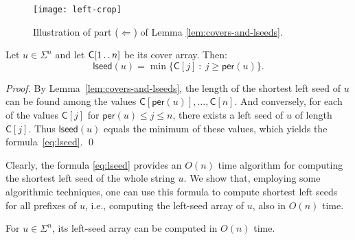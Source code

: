 \documentclass{llncs}
\newcommand{\per}{\textsf{per}}
\newcommand{\lseed}{\textsf{lseed}}
\newcommand{\Cover}{\textsf{C}}
\def\dotdot{\mathinner{\ldotp\ldotp}}
\begin{document}
\begin{figure}
\begin{center}
  \texttt{[image: left-crop]}
\end{center}
\caption{\label{fig:lem-cbls-a}
  Illustration of part ($\Leftarrow$) of Lemma \ref{lem:covers-and-lseeds}.
}
\end{figure}

  \begin{lemma}\label{lem:lseed}
    Let $u \in \Sigma^n$ and let $\Cover[1 \dotdot n]$ be its cover array.
    Then:
    \begin{equation}\label{eq:lseed}
      \lseed(u) = \min\{\Cover[j]\ :\ j \ge \per(u)\}.
    \end{equation}
  \end{lemma}

  \begin{proof}
    By Lemma~\ref{lem:covers-and-lseeds}, the length of the shortest left seed of $u$
    can be found among the values $\Cover[\per(u)],\ldots,\Cover[n]$.
    And conversely, for each of the values $\Cover[j]$ for $\per(u) \le j \le n$, there exists
    a left seed of $u$ of length $\Cover[j]$.
    Thus $\lseed(u)$ equals the minimum of these values, which yields the formula~\eqref{eq:lseed}.
  \qed
  \end{proof}

  \noindent
  Clearly, the formula \eqref{eq:lseed} provides an $O(n)$ time algorithm
  for computing the shortest left seed of the whole string $u$.
  We show that, employing some algorithmic techniques, one can use this formula to compute
  shortest left seeds for all prefixes of $u$, i.e., computing the left-seed array of $u$,
  also in $O(n)$ time.

  \begin{theorem}
    For $u \in \Sigma^n$, its left-seed array can be computed in $O(n)$ time.
  \end{theorem}
\end{document}
